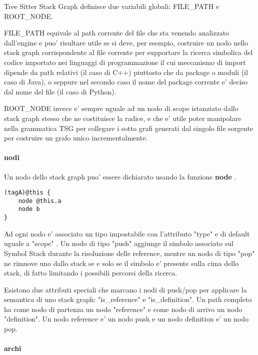 Tree Sitter Stack Graph definisce due variabili globali: FILE\_PATH e ROOT\_NODE.

FILE\_PATH equivale al path corrente del file che sta venendo analizzato dall'engine e puo' risultare utile se si deve, per esempio, costruire un nodo nello stack graph corrispondente al file corrente per supportare la ricerca simbolica del codice importato nei linguaggi di programmazione il cui meccanismo di import dipende da path relativi (il caso di C++) piuttosto che da package o moduli (il caso di Java), o seppure nel secondo caso il nome del package corrente e' deciso dal nome del file (il caso di Python).

ROOT\_NODE invece e' sempre uguale ad un nodo di scope istanziato dallo stack graph stesso che ne costituisce la radice, e che e' utile poter manipolare nella grammatica TSG per collegare i sotto grafi generati dal singolo file sorgente per costruire un grafo unico incrementalmente.

\paragraph{nodi}

Un nodo dello stack graph puo' essere dichiarato usando la funzione \textbf{node} \cite{TreeSitterGraphReferenceGraphNodes}.

\begin{Verbatim}[samepage=true]
(tagA)@this {
    node @this.a
    node b
}
\end{Verbatim}

Ad ogni nodo e' associato un tipo impostabile con l'attributo "type" e di default uguale a "scope" \cite{TreeSitterStackGraphNodes}.
Un nodo di tipo "push" aggiunge il simbolo associato sul Symbol Stack durante la risoluzione delle reference, mentre un nodo di tipo "pop" ne rimuove uno dallo stack se e solo se il simbolo e' presente sulla cima dello stack, di fatto limitando i possibili percorsi della ricerca.

Esistono due attributi speciali che marcano i nodi di push/pop per applicare la semantica di uno stack graph: "is\_reference" e "is\_definition".
Un path completo ha come nodo di partenza un nodo "reference" e come nodo di arrivo un nodo "definition".
Un nodo reference e' un nodo push e un nodo definition e' un nodo pop.

\paragraph{archi}

